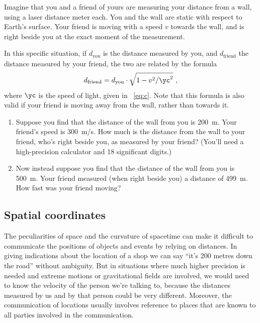 \begin{exercise}[label={ex:distance}]
  Imagine that you and a friend of yours are measuring your distance from a wall, using a laser distance meter each. You and the wall are static with respect to Earth's surface. Your friend is moving with a speed $v$ towards the wall, and is right beside you at the exact moment of the measurement.

  \smallskip

  In this specific situation, if $d_{\textrm{you}}$ is the distance measured by you, and $d_{\textrm{friend}}$ the distance measured by your friend, the two are related by the formula
  \begin{equation*}
    d_{\textrm{friend}} = d_{\textrm{you}} \cdot \sqrt{1 - v^{2}/\yc^{2}} \ ,
  \end{equation*}
  where $\yc$ is the speed of light, given in \eqn~\eqref{eq:c}. Note that this formula is also valid if your friend is moving away from the wall, rather than towards it.

\begin{enumerate}[exerc]
\item\label{item:distance_friend} Suppose you find that the distance of the wall from you is \qty{200}{m}. Your friend's speed is \qty{300}{m/s}. How much is the distance from the wall to your friend, who's right beside you, as measured by your friend? (You'll need a high-precision calculator and 18 significant digits.)

\item\label{item:velocity_friend} Now instead suppose you find that the distance of the wall from you is \qty{500}{m}. Your friend measured (when right beside you) a distance of \qty{499}{m}. How fast was your friend moving?
\end{enumerate}
\end{exercise}

\subsection{Spatial coordinates}
\label{sec:coord_space}

The peculiarities of space and the curvature of spacetime can make it difficult to communicate the positions of objects and events by relying on distances. In giving indications about the location of a shop we can say \enquote{it's 200 metres down the road} without ambiguity. But in situations where much higher precision is needed and extreme motions or gravitational fields are involved, we would need to know the velocity of the person we're talking to, because the distances measured by us and by that person could be very different. Moreover, the communication of locations usually involves reference to places that are known to all parties involved in the communication.

